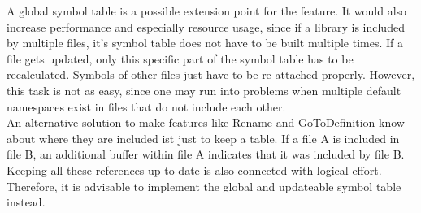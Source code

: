 A global symbol table is a possible extension point for the feature.
It would also increase performance and especially resource usage, since if a library is included by multiple files, it's symbol table does not have to be built multiple times.
If a file gets updated, only this specific part of the symbol table has to be recalculated. Symbols of other files just have to be re-attached properly.
However, this task is not as easy, since one may run into problems when multiple default namespaces exist in files that do not include each other.\\

An alternative solution to make features like Rename and GoToDefinition know about where they are included ist just to keep a table.
If a file A is included in file B, an additional buffer within file A indicates that it was included by file B.
Keeping all these references up to date is also connected with logical effort.
Therefore, it is advisable to implement the global and updateable symbol table instead.
